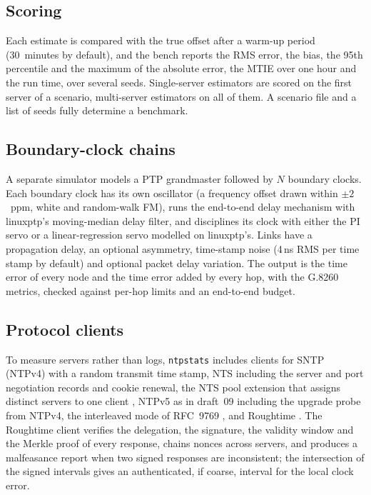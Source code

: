 \documentclass[11pt,a4paper]{article}
\newcommand{\ntp}{\texttt{ntpstats}}
\newcommand{\ns}{\,ns}
\begin{document}
\subsection{Scoring}

Each estimate is compared with the true offset after a warm-up period (30~minutes by default), and the
bench reports the RMS error, the bias, the 95th percentile and the maximum of the absolute error, the
MTIE over one hour and the run time, over several seeds. Single-server estimators are scored on the
first server of a scenario, multi-server estimators on all of them. A scenario file and a list of seeds
fully determine a benchmark.

\subsection{Boundary-clock chains}

A separate simulator models a PTP grandmaster followed by $N$ boundary clocks. Each boundary clock has
its own oscillator (a frequency offset drawn within $\pm 2$~ppm, white and random-walk FM), runs the
end-to-end delay mechanism with linuxptp's moving-median delay filter, and disciplines its clock with
either the PI servo or a linear-regression servo modelled on linuxptp's. Links have a propagation
delay, an optional asymmetry, time-stamp noise (4\ns{} RMS per time stamp by default) and optional
packet delay variation. The output is the time error of every node and the time error added by every
hop, with the G.8260 metrics, checked against per-hop limits and an end-to-end budget.

\subsection{Protocol clients}

To measure servers rather than logs, \ntp{} includes clients for SNTP (NTPv4) with a random transmit
time stamp, NTS \citep{rfc8915} including the server and port negotiation records and cookie renewal,
the NTS pool extension that assigns distinct servers to one client \citep{ntspooldraft}, NTPv5 as in
draft~09 \citep{ntpv5draft} including the upgrade probe from NTPv4, the interleaved mode of RFC~9769
\citep{rfc9769}, and Roughtime \citep{roughtimedraft}. The Roughtime client verifies the delegation,
the signature, the validity window and the Merkle proof of every response, chains nonces across
servers, and produces a malfeasance report when two signed responses are inconsistent; the intersection
of the signed intervals gives an authenticated, if coarse, interval for the local clock error.
\end{document}

